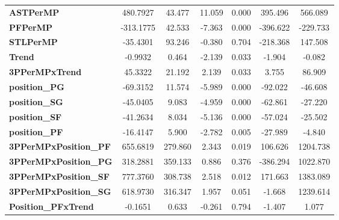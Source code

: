 \begin{center}
\begin{tabular}{lcccccc}
\textbf{ASTPerMP}                   &     480.7927  &       43.477     &    11.059  &         0.000        &      395.496    &      566.089     \\
\textbf{PFPerMP}                    &    -313.1775  &       42.533     &    -7.363  &         0.000        &     -396.622    &     -229.733     \\
\textbf{STLPerMP}                   &     -35.4301  &       93.246     &    -0.380  &         0.704        &     -218.368    &      147.508     \\
\textbf{Trend}                      &      -0.9932  &        0.464     &    -2.139  &         0.033        &       -1.904    &       -0.082     \\
\textbf{3PPerMPxTrend}              &      45.3322  &       21.192     &     2.139  &         0.033        &        3.755    &       86.909     \\
\textbf{position\_PG}               &     -69.3152  &       11.574     &    -5.989  &         0.000        &      -92.022    &      -46.608     \\
\textbf{position\_SG}               &     -45.0405  &        9.083     &    -4.959  &         0.000        &      -62.861    &      -27.220     \\
\textbf{position\_SF}               &     -41.2634  &        8.034     &    -5.136  &         0.000        &      -57.024    &      -25.502     \\
\textbf{position\_PF}               &     -16.4147  &        5.900     &    -2.782  &         0.005        &      -27.989    &       -4.840     \\
\textbf{3PPerMPxPosition\_PF}       &     655.6819  &      279.860     &     2.343  &         0.019        &      106.626    &     1204.738     \\
\textbf{3PPerMPxPosition\_PG}       &     318.2881  &      359.133     &     0.886  &         0.376        &     -386.294    &     1022.870     \\
\textbf{3PPerMPxPosition\_SF}       &     777.3760  &      308.738     &     2.518  &         0.012        &      171.663    &     1383.089     \\
\textbf{3PPerMPxPosition\_SG}       &     618.9730  &      316.347     &     1.957  &         0.051        &       -1.668    &     1239.614     \\
\textbf{Position\_PFxTrend}         &      -0.1651  &        0.633     &    -0.261  &         0.794        &       -1.407    &        1.077     \\

\end{tabular}
\end{center}
